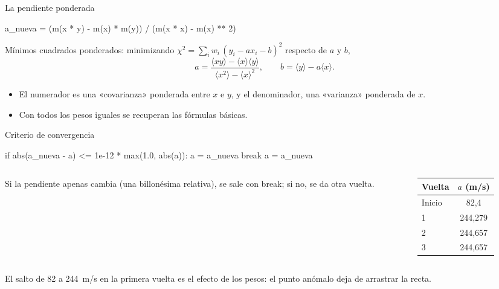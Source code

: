 \documentclass[10pt]{beamer}
\newcommand{\cod}[1]{{\setlength{\fboxsep}{1.4pt}\colorbox{codinline}{\textcolor{codrojo}{\ttfamily\small #1}}}}
\newcommand{\resalta}[1]{\textcolor{structure.fg!75!white}{#1}}
\begin{document}
\begin{frame}[fragile]{La pendiente ponderada}
  \begin{codigo}[listing options={style=python, basicstyle=\ttfamily\scriptsize\color{codtexto}}]
a_nueva = (m(x * y) - m(x) * m(y)) / (m(x * x) - m(x) ** 2)
  \end{codigo}
  \begin{block}{}
    \resalta{Mínimos cuadrados ponderados:} minimizando
    $\chi^{2}=\sum_i w_i\,(y_i-ax_i-b)^{2}$ respecto de $a$ y $b$,
    \begin{equation}
      a=\frac{\langle xy\rangle-\langle x\rangle\langle y\rangle}
             {\langle x^{2}\rangle-\langle x\rangle^{2}},
      \qquad
      b=\langle y\rangle-a\langle x\rangle .
    \end{equation}
  \end{block}
  \begin{itemize}
    \item El numerador es una «covarianza» ponderada entre $x$ e $y$, y el
      denominador, una «varianza» ponderada de $x$.
    \item Con todos los pesos iguales se recuperan las fórmulas básicas.
  \end{itemize}
\end{frame}

\begin{frame}[fragile]{Criterio de convergencia}
  \begin{codigo}
if abs(a_nueva - a) <= 1e-12 * max(1.0, abs(a)):
    a = a_nueva
    break
a = a_nueva
  \end{codigo}
  \begin{columns}[T]
    \begin{column}{0.52\textwidth}
      \small Si la pendiente apenas cambia (una billonésima relativa), se sale con
      \cod{break}; si no, se da otra vuelta.
    \end{column}
    \begin{column}{0.44\textwidth}
      \centering\small
      \begin{tabular}{@{}lc@{}}
        \toprule
        Vuelta & $a$ (m/s)\\
        \midrule
        Inicio & 82,4\\
        1 & 244,279\\
        2 & 244,657\\
        3 & 244,657\\
        \bottomrule
      \end{tabular}
    \end{column}
  \end{columns}
  \begin{block}{}
    El salto de 82 a 244~m/s en la primera vuelta es el efecto de los pesos: el
    punto anómalo deja de arrastrar la recta.
  \end{block}
\end{frame}
\end{document}
